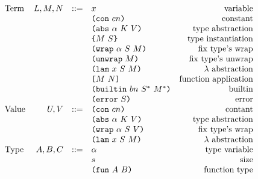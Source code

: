 \documentclass[../plutus-core-specification.tex]{subfiles}
\begin{document}
\begin{figure*}[t]
    \centering
    \[\begin{array}{lrclr}
        \textrm{Term}             & L,M,N  & ::= & x                          & \textrm{variable}\\
                                  &        &     & \texttt{(} \texttt{con} ~ cn \texttt{)}                   & \textrm{constant}\\
                                  &        &     & \texttt{(} \texttt{abs} ~ \alpha ~ K ~ V \texttt{)}         & \textrm{type abstraction}\\
                                  &        &     & \texttt{\{}M ~ S\texttt{\}}                & \textrm{type instantiation}\\
                                  &        &     & \texttt{(} \texttt{wrap} ~ \alpha ~ S ~ M \texttt{)}        & \textrm{fix type's wrap}\\
                                  &        &     & \texttt{(} \texttt{unwrap} ~ M \texttt{)}                 & \textrm{fix type's unwrap}\\
                                  &        &     & \texttt{(} \texttt{lam} ~ x ~ S ~ M \texttt{)}              & \textrm{$\lambda$ abstraction}\\
                                  &        &     & \texttt{[} M ~ N \texttt{]}                 & \textrm{function application}\\
                                  &        &     & \texttt{(} \texttt{builtin} ~ bn ~ S^* ~ M^* \texttt{)}     & \textrm{builtin}\\
                                  &        &     & \texttt{(} \texttt{error} ~ S \texttt{)}                  & \textrm{error}\\
        \textrm{Value}            & U, V   & ::= & \texttt{(} \texttt{con} ~ cn \texttt{)}                   & \textrm{contant}\\
                                  &        &     & \texttt{(} \texttt{abs} ~ \alpha ~ K ~ V \texttt{)}         & \textrm{type abstraction}\\
                                  &        &     & \texttt{(} \texttt{wrap} ~ \alpha ~ S ~ V \texttt{)}        & \textrm{fix type's wrap}\\
                                  &        &     & \texttt{(} \texttt{lam} ~ x ~ S ~ M \texttt{)}              & \textrm{$\lambda$ abstraction}\\
        \textrm{Type}             & A,B,C  & ::= & \alpha                     & \textrm{type variable}\\
                                  &        &     & s                          & \textrm{size}\\
                                  &        &     & \texttt{(} \texttt{fun} ~ A ~ B \texttt{)}                & \textrm{function type}\\

\end{array}\]
\end{figure*}
\end{document}
